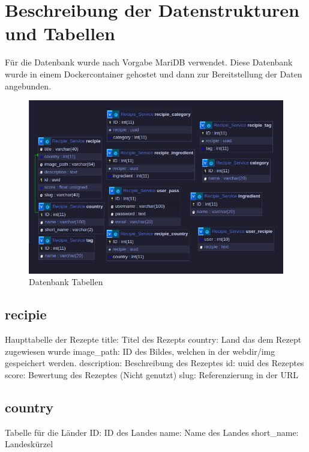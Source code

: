 \documentclass{article}
\begin{document}
\pagebreak
\section{Beschreibung der Datenstrukturen \newline und Tabellen}

Für die Datenbank wurde nach Vorgabe MariDB verwendet. Diese Datenbank wurde in einem Dockercontainer gehostet und dann zur Bereitstellung der Daten angebunden.

\begin{figure}[!hbt]
    \centering
    \includegraphics[scale=0.75, width=\textwidth]{Pictures/DB_Tables2.png}
    \caption{Datenbank Tabellen}
    \label{fig:sfig1}
\end{figure}

\subsection{recipie}
Haupttabelle der Rezepte
\newline
title: Titel des Rezepts
\newline
country: Land das dem Rezept zugewiesen wurde
\newline
image\_path: ID des Bildes, welchen in der webdir/img gespeichert werden.
\newline
description: Beschreibung des Rezeptes
\newline
id: uuid des Rezeptes
\newline
score: Bewertung des Rezeptes (Nicht genutzt)
\newline
slug: Referenzierung in der URL

\subsection{country}
Tabelle für die Länder
ID: ID des Landes
\newline
name: Name des Landes
\newline
short\_name: Landeskürzel
\end{document}
